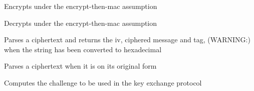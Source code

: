 \documentclass[letterpaper,10pt,english]{sphinxmanual}
\begin{document}

\begin{fulllineitems}
\label{restaurants:restaurants.key_exchange.encrypt}
Encrypts under the encrypt-then-mac assumption

\end{fulllineitems}


\begin{fulllineitems}
\label{restaurants:restaurants.key_exchange.decrypt}
Decrypts under the encrypt-then-mac assumption

\end{fulllineitems}


\begin{fulllineitems}
\label{restaurants:restaurants.key_exchange.parse_ct}
Parses a ciphertext and returns the iv, ciphered message and tag, (WARNING:) when the string has been converted to hexadecimal

\end{fulllineitems}


\begin{fulllineitems}
\label{restaurants:restaurants.key_exchange.parse_ct_original}
Parses a ciphertext when it is on its original form

\end{fulllineitems}


\begin{fulllineitems}
\label{restaurants:restaurants.key_exchange.computeSecret}
Computes the challenge to be used in the key exchange protocol

\end{fulllineitems}
\end{document}
